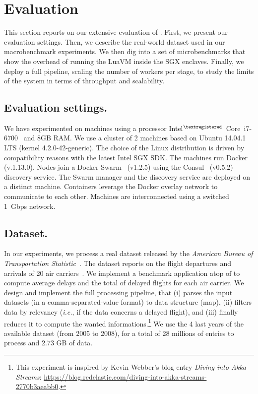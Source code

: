 \section{Evaluation}
\label{sec:eval}


This section reports on our extensive evaluation of \SYS.
First, we present our evaluation settings.
Then, we describe the real-world dataset used in our macrobenchmark experiments.
We then dig into a set of microbenchmarks that show the overhead of running the LuaVM inside the SGX enclaves.
Finally, we deploy a full \SYS pipeline, scaling the number of workers per stage, to study the limits of the system in terms of throughput and scalability.


\subsection{Evaluation settings.}
We have experimented on machines using a processor Intel$^{\tiny{\textregistered}}$~Core\texttrademark~i7-6700~\cite{intel:i7_6700} and 8GB RAM.
We use a cluster of 2 machines based on Ubuntu 14.04.1 LTS (kernel 4.2.0-42-generic).
The choice of the Linux distribution is driven by compatibility reasons with the latest Intel SGX SDK. 
The machines run Docker (v.1.13.0).
Nodes join a Docker Swarm~\cite{docker:swarm_2016} (v1.2.5) using the Consul~\cite{consul} (v0.5.2) discovery service.
The Swarm manager and the discovery service are deployed on a distinct machine.
Containers leverage the Docker overlay network to communicate to each other.
Machines are interconnected using a switched 1~Gbps network.



\subsection{Dataset.}
In our experiments, we process a real dataset released by the \emph{American Bureau of Transportation Statistic}~\cite{rita:bts}.
The dataset reports on the flight departures and arrivals of 20 air carriers~\cite{statistical_computing:data}.
We implement a benchmark application atop of \SYS to compute average delays and the total of delayed flights for each air carrier.
We design and implement the full processing pipeline, that (i) parses the input datasets (in a comma-separated-value format) to data structure (\textsf{map}), (ii) filters data by relevancy (\emph{i.e.}, if the data concerns a delayed flight), and (iii) finally reduces it to compute the wanted informations.\footnote{This experiment is inspired by Kevin Webber's blog entry \emph{Diving into Akka Streams}: \url{https://blog.redelastic.com/diving-into-akka-streams-2770b3aeabb0}.}
We use the 4 last years of the available dataset (from 2005 to 2008), for a total of 28 millions of entries to process and 2.73 GB of data.

